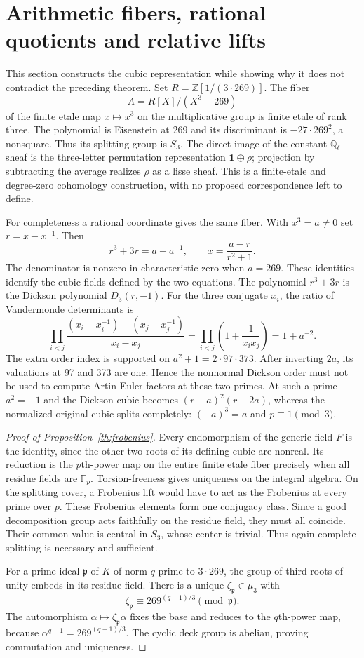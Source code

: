 \documentclass[11pt]{article}
\theoremstyle{remark}\newtheorem{remark}[theorem]{Remark}
\newcommand{\Q}{\mathbb Q}\newcommand{\Z}{\mathbb Z}\newcommand{\C}{\mathbb C}
\newcommand{\F}{\mathbb F}\newcommand{\Gal}{\operatorname{Gal}}
\begin{document}
\section{Arithmetic fibers, rational quotients and relative lifts}
This section constructs the cubic representation while showing why it does not contradict the preceding theorem. Set $R=\Z[1/(3\cdot269)]$. The fiber
\[
 A=R[X]/(X^3-269)
\]
of the finite etale map $x\mapsto x^3$ on the multiplicative group is finite etale of rank three. The polynomial is Eisenstein at 269 and its discriminant is $-27\cdot269^2$, a nonsquare. Thus its splitting group is $S_3$. The direct image of the constant $\Q_\ell$-sheaf is the three-letter permutation representation $\mathbf1\oplus\rho$; projection by subtracting the average realizes $\rho$ as a lisse sheaf. This is a finite-etale and degree-zero cohomology construction, with no proposed correspondence left to define.

For completeness a rational coordinate gives the same fiber. With $x^3=a\ne0$ set $r=x-x^{-1}$. Then
\[
 r^3+3r=a-a^{-1},\qquad x=\frac{a-r}{r^2+1}.
\]
The denominator is nonzero in characteristic zero when $a=269$. These identities identify the cubic fields defined by the two equations. The polynomial $r^3+3r$ is the Dickson polynomial $D_3(r,-1)$. For the three conjugate $x_i$, the ratio of Vandermonde determinants is
\[
 \prod_{i<j}\frac{(x_i-x_i^{-1})-(x_j-x_j^{-1})}{x_i-x_j}
 =\prod_{i<j}\left(1+\frac1{x_ix_j}\right)=1+a^{-2}.
\]
The extra order index is supported on $a^2+1=2\cdot97\cdot373$. After inverting $2a$, its valuations at 97 and 373 are one. Hence the nonnormal Dickson order must not be used to compute Artin Euler factors at these two primes. At such a prime $a^2=-1$ and the Dickson cubic becomes $(r-a)^2(r+2a)$, whereas the normalized original cubic splits completely: $(-a)^3=a$ and $p\equiv1\pmod3$.

\begin{proof}[Proof of Proposition~\ref{th:frobenius}]
Every endomorphism of the generic field $F$ is the identity, since the other two roots of its defining cubic are nonreal. Its reduction is the $p$th-power map on the entire finite etale fiber precisely when all residue fields are $\F_p$. Torsion-freeness gives uniqueness on the integral algebra. On the splitting cover, a Frobenius lift would have to act as the Frobenius at every prime over $p$. These Frobenius elements form one conjugacy class. Since a good decomposition group acts faithfully on the residue field, they must all coincide. Their common value is central in $S_3$, whose center is trivial. Thus again complete splitting is necessary and sufficient.

For a prime ideal $\mathfrak p$ of $K$ of norm $q$ prime to $3\cdot269$, the group of third roots of unity embeds in its residue field. There is a unique $\zeta_{\mathfrak p}\in\mu_3$ with
\[
 \zeta_{\mathfrak p}\equiv269^{(q-1)/3}\pmod{\mathfrak p}.
\]
The automorphism $\alpha\mapsto\zeta_{\mathfrak p}\alpha$ fixes the base and reduces to the $q$th-power map, because $\alpha^{q-1}=269^{(q-1)/3}$. The cyclic deck group is abelian, proving commutation and uniqueness.
\end{proof}
\end{document}
